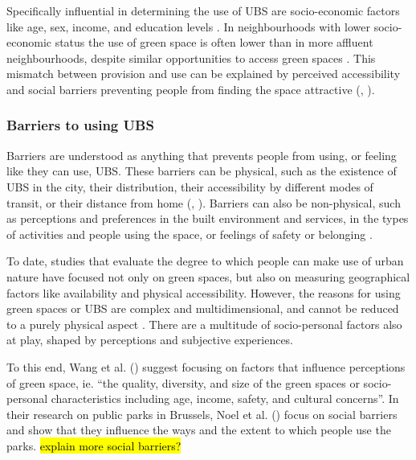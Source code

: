 \documentclass{article}
\begin{document}
Specifically influential in determining the use of UBS are socio-economic factors like age, sex, income, and education levels \parencite{REF}. In neighbourhoods with lower socio-economic status the use of green space is often lower than in more affluent neighbourhoods, despite similar opportunities to access green spaces \parencite{REF}. This mismatch between provision and use can be explained by perceived accessibility and social barriers preventing people from finding the space attractive (\cite{wang2015comparison}, \cite{noel2021social}).

\subsubsection{Barriers to using UBS}

Barriers are understood as anything that prevents people from using, or feeling like they can use, UBS.
These barriers can be physical, such as the existence of UBS in the city, their distribution, their accessibility by different modes of transit, or their distance from home (\cite{REF}, \cite{REF}). Barriers can also be non-physical, such as perceptions and preferences in the built environment and services, in the types of activities and people using the space, or feelings of safety or belonging \parencite{REF}.

To date, studies that evaluate the degree to which people can make use of urban nature have focused not only on green spaces, but also on measuring geographical factors like availability and physical accessibility.
However, the reasons for using green spaces or UBS are complex and multidimensional, and cannot be reduced to a purely physical aspect \parencite{wang2015physical}. There are a multitude of socio-personal factors also at play, shaped by perceptions and subjective experiences.

To this end, Wang et al. (\citeyear{wang2015physical}) suggest focusing on factors that influence perceptions of green space, ie. ``the quality, diversity, and size of the green spaces or socio-personal characteristics including age, income, safety, and cultural concerns''. In their research on public parks in Brussels, Noel et al. (\citeyear{noel2021social}) focus on social barriers and show that they influence the ways and the extent to which people use the parks.
\hl{explain more social barriers?}
\end{document}
